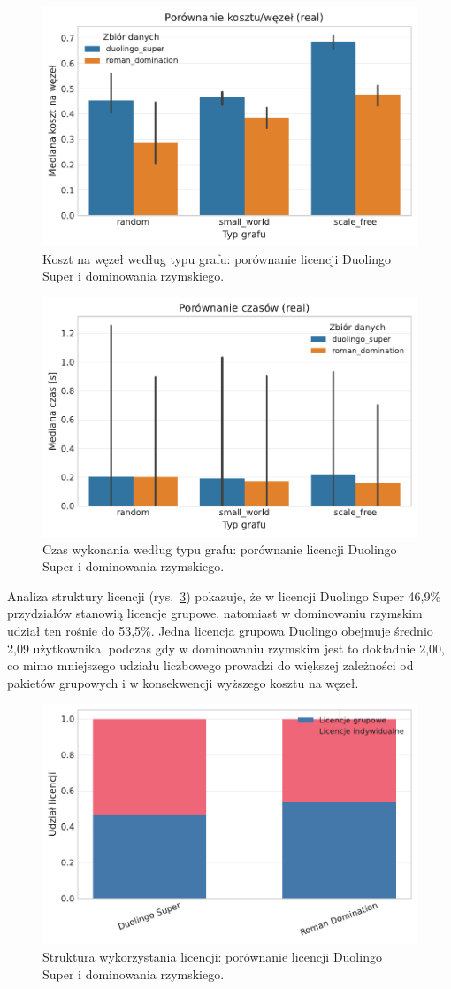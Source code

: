\begin{figure}[H]
  \centering
  \includegraphics[width=0.6\linewidth]{assets/figures/benchmark/real/duo_vs_roman_cost_per_node_by_graph.pdf}
  \caption{Koszt na węzeł według typu grafu: porównanie licencji Duolingo Super i dominowania rzymskiego.}
  \label{fig:duo-roman-cost}
\end{figure}

\begin{figure}[H]
  \centering
  \includegraphics[width=0.6\linewidth]{assets/figures/benchmark/real/duo_vs_roman_time_by_graph.pdf}
  \caption{Czas wykonania według typu grafu: porównanie licencji Duolingo Super i dominowania rzymskiego.}
  \label{fig:duo-roman-time}
\end{figure}

Analiza struktury licencji (rys.~\ref{fig:duo-roman-license}) pokazuje, że w licencji Duolingo Super 46{,}9\% przydziałów stanowią licencje grupowe, natomiast w dominowaniu rzymskim udział ten rośnie do 53{,}5\%. Jedna licencja grupowa Duolingo obejmuje średnio 2{,}09 użytkownika, podczas gdy w dominowaniu rzymskim jest to dokładnie 2,00, co mimo mniejszego udziału liczbowego prowadzi do większej zależności od pakietów grupowych i w konsekwencji wyższego kosztu na węzeł.

\begin{figure}[H]
  \centering
  \includegraphics[width=0.6\linewidth]{assets/figures/benchmark/synthetic/license_mix_duo_vs_roman.pdf}
  \caption{Struktura wykorzystania licencji: porównanie licencji Duolingo Super i dominowania rzymskiego.}
  \label{fig:duo-roman-license}
\end{figure}

